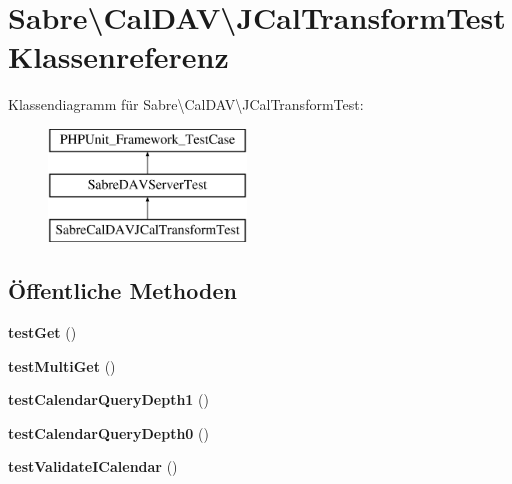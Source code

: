 \hypertarget{class_sabre_1_1_cal_d_a_v_1_1_j_cal_transform_test}{}\section{Sabre\textbackslash{}Cal\+D\+AV\textbackslash{}J\+Cal\+Transform\+Test Klassenreferenz}
\label{class_sabre_1_1_cal_d_a_v_1_1_j_cal_transform_test}
Klassendiagramm für Sabre\textbackslash{}Cal\+D\+AV\textbackslash{}J\+Cal\+Transform\+Test\+:\begin{figure}[H]
\begin{center}
\leavevmode
\includegraphics[height=3.000000cm]{class_sabre_1_1_cal_d_a_v_1_1_j_cal_transform_test}
\end{center}
\end{figure}
\subsection*{Öffentliche Methoden}
\begin{DoxyCompactItemize}
\item 
\mbox{\label{class_sabre_1_1_cal_d_a_v_1_1_j_cal_transform_test_a3f63eceffa45ebf95c2c97cb74420c06}} 
{\bfseries test\+Get} ()
\item 
\mbox{\label{class_sabre_1_1_cal_d_a_v_1_1_j_cal_transform_test_a852724503430f8202da625851c02553e}} 
{\bfseries test\+Multi\+Get} ()
\item 
\mbox{\label{class_sabre_1_1_cal_d_a_v_1_1_j_cal_transform_test_a39ccdd6a20be2efdfc288d248fd09f4a}} 
{\bfseries test\+Calendar\+Query\+Depth1} ()
\item 
\mbox{\label{class_sabre_1_1_cal_d_a_v_1_1_j_cal_transform_test_ab4c4fd4a882c7140d2d677de4d558616}} 
{\bfseries test\+Calendar\+Query\+Depth0} ()
\item 
\mbox{\label{class_sabre_1_1_cal_d_a_v_1_1_j_cal_transform_test_ad719b14de0924dd526b97d54bba0adfb}} 
{\bfseries test\+Validate\+I\+Calendar} ()
\end{DoxyCompactItemize}
